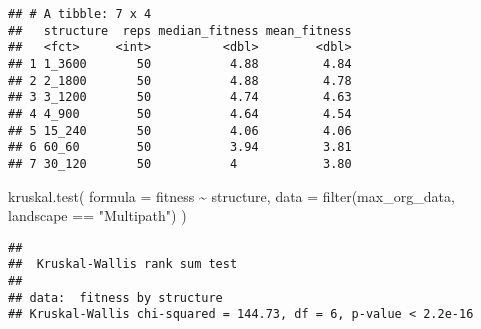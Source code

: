 \documentclass[
]{book}
\newenvironment{Shaded}{\begin{snugshade}}{\end{snugshade}}
\newcommand{\AttributeTok}[1]{\textcolor[rgb]{0.77,0.63,0.00}{#1}}
\newcommand{\ConstantTok}[1]{\textcolor[rgb]{0.00,0.00,0.00}{#1}}
\newcommand{\FunctionTok}[1]{\textcolor[rgb]{0.00,0.00,0.00}{#1}}
\newcommand{\NormalTok}[1]{#1}
\newcommand{\OtherTok}[1]{\textcolor[rgb]{0.56,0.35,0.01}{#1}}
\newcommand{\SpecialCharTok}[1]{\textcolor[rgb]{0.00,0.00,0.00}{#1}}
\newcommand{\StringTok}[1]{\textcolor[rgb]{0.31,0.60,0.02}{#1}}
\begin{document}
\begin{verbatim}
## # A tibble: 7 x 4
##   structure  reps median_fitness mean_fitness
##   <fct>     <int>          <dbl>        <dbl>
## 1 1_3600       50           4.88         4.84
## 2 2_1800       50           4.88         4.78
## 3 3_1200       50           4.74         4.63
## 4 4_900        50           4.64         4.54
## 5 15_240       50           4.06         4.06
## 6 60_60        50           3.94         3.81
## 7 30_120       50           4            3.80
\end{verbatim}

\begin{Shaded}
\begin{Highlighting}[]
\FunctionTok{kruskal.test}\NormalTok{(}
  \AttributeTok{formula =}\NormalTok{ fitness }\SpecialCharTok{\textasciitilde{}}\NormalTok{ structure,}
  \AttributeTok{data =} \FunctionTok{filter}\NormalTok{(max\_org\_data, landscape }\SpecialCharTok{==} \StringTok{"Multipath"}\NormalTok{)}
\NormalTok{)}
\end{Highlighting}
\end{Shaded}

\begin{verbatim}
## 
##  Kruskal-Wallis rank sum test
## 
## data:  fitness by structure
## Kruskal-Wallis chi-squared = 144.73, df = 6, p-value < 2.2e-16
\end{verbatim}

\begin{Shaded}
\end{Shaded}
\end{document}
